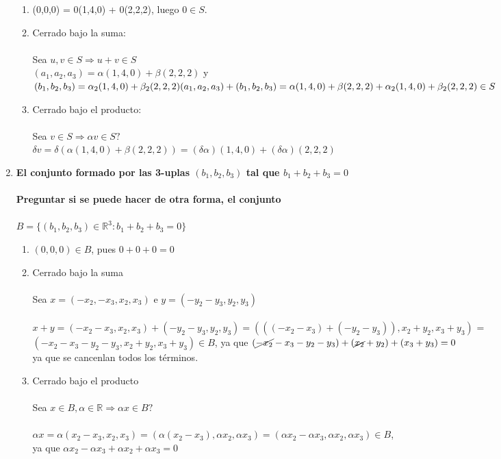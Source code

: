 \documentclass{article}
\begin{document}
\begin{enumerate}[1.]
\begin{enumerate}[(1)]
\item
	(0,0,0) = 0(1,4,0) + 0(2,2,2), luego $0 \in S$.
\item
	Cerrado bajo la suma: \\ \\
	Sea $u,v \in S \Rightarrow u+v \in S$ \\
	$(a_1,a_2,a_3) = \alpha(1,4,0) + \beta(2,2,2)$ y $(b_1,b_2,b_3) = \alpha_2(1,4,0) + \beta_2(2,2,2) \\
	(a_1,a_2,a_3) + (b_1,b_2,b_3) = \alpha (1,4,0) + \beta (2,2,2) + \alpha_2(1,4,0) + \beta_2(2,2,2) \in S $
\item
	Cerrado bajo el producto: \\ \\
	Sea $v \in S \Rightarrow \alpha v \in S?$\\
	$\delta v = \delta (\alpha (1,4,0)+\beta(2,2,2)) = (\delta \alpha)(1,4,0) + (\delta \alpha)(2,2,2)$
\end{enumerate}
\item \textbf{El conjunto formado por las 3-uplas $(b_1,b_2,b_3)$ tal que $b_1+b_2+b_3 = 0$} \\ \\
\textbf{Preguntar si se puede hacer de otra forma, el conjunto} \\ \\
$B = \lbrace (b_1,b_2,b_3) \in \mathbb{R}^3: b_1+b_2+b_3 = 0 \rbrace$
\begin{enumerate}[(1)]
\item 
	$(0,0,0) \in B$, pues $0+0+0 = 0$
\item
	Cerrado bajo la suma \\ \\
	Sea $x = (-x_2,-x_3,x_2,x_3)$ e $y = (-y_2-y_3,y_2,y_3)$ \\ \\
	$x+y = (-x_2-x_3,x_2,x_3) + (-y_2-y_3,y_2,y_3) = (((-x_2-x_3)+(-y_2-y_3)),x_2+y_2,x_3+y_3)$ = \\
	$(-x_2-x_3-y_2-y_3,x_2+y_2,x_3+y_3) \in B$, ya que $(\cancel{-x_2}-x_3-y_2-y_3) + (\cancel{x_2}+y_2) + (x_3+y_3) = 0$\\
	ya que se cancenlan todos los términos. \\
\item
	Cerrado bajo el producto \\ \\
	Sea $x \in B, \alpha \in \mathbb{R} \Rightarrow \alpha x \in B?$ \\ \\
	$\alpha x = \alpha (x_2-x_3,x_2,x_3) = (\alpha (x_2-x_3), \alpha x_2, \alpha x_3) = ( \alpha x_2 - \alpha x_3, \alpha x_2, \alpha x_3)
	\in B$, \\ ya que $\alpha x_2 - \alpha x_3 + \alpha x_2 + \alpha x_3 = 0$
\end{enumerate}


\end{enumerate}
\end{document}
